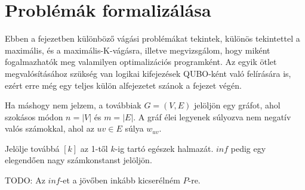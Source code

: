 
\chapter{Problémák formalizálása}


Ebben a fejezetben különböző vágási problémákat tekintek, különös tekintettel a maximális, és a maximális-K-vágásra, illetve megvizsgálom, hogy miként fogalmazhatók meg valamilyen optimalizációs programként. Az egyik ötlet megvalósításához szükség van logikai kifejezések QUBO-ként való felírására is, ezért erre még egy teljes külön alfejezetet szánok a fejezet végén.

Ha máshogy nem jelzem, a továbbiak $G=(V,E)$ jelöljön egy gráfot, ahol szokásos módon $n=|V|$ és $m=|E|$. A gráf élei legyenek súlyozva nem negatív valós számokkal, ahol az $uv \in E$ súlya $w_{uv}$.

Jelölje továbbá $[k]$ az 1-től $k$-ig tartó egészek halmazát. $inf$ pedig egy elegendően nagy számkonstanst jelöljön.

TODO: Az $inf$-et a jövőben inkább kicserélném $P$-re.

